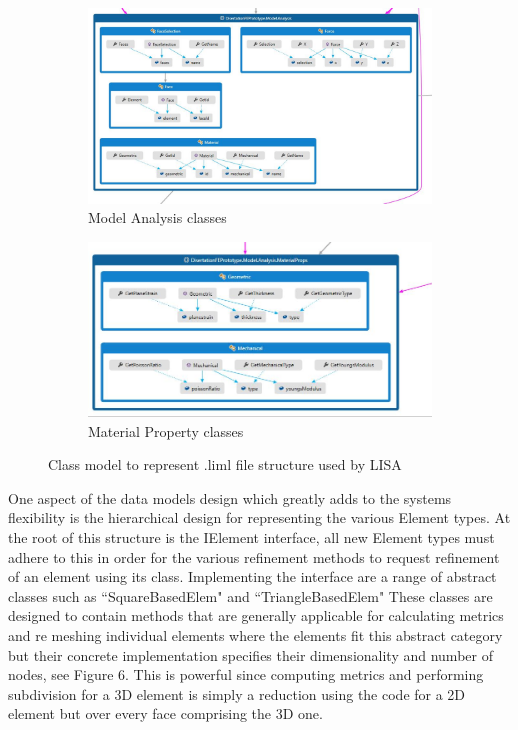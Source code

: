 \begin{figure}[H]
\centering
\begin{subfigure}{.5\textwidth}
  \centering
  \includegraphics[width=0.9\linewidth]{../Graphics/DissoFEProto-ModelAnalysis.jpg}
  \caption{Model Analysis classes}
  \label{fig:sub1}
\end{subfigure}%
\begin{subfigure}{.5\textwidth}
  \centering
  \includegraphics[width=0.9\linewidth]{../Graphics/DissoFEProto-MaterialProps.jpg}
  \caption{Material Property classes}
  \label{fig:sub2}
\end{subfigure}
\label{fig:test}
\caption{Class model to represent .liml file structure used by LISA}
\end{figure}

\noindent
One aspect of the data models design which greatly adds to the systems flexibility is the hierarchical design for representing the various Element types. At the root of this structure is the IElement interface, all new Element types must adhere to this in order for the various refinement methods to request refinement of an element using its class. Implementing the interface are a range of abstract classes such as ``SquareBasedElem" and ``TriangleBasedElem" These classes are designed to contain methods that are generally applicable for calculating metrics and re meshing individual elements where the elements fit this abstract category but their concrete implementation specifies their dimensionality and number of nodes, see Figure 6. This is powerful since computing metrics and performing subdivision for a 3D element is simply a reduction using the code for a 2D element but over every face comprising the 3D one. \\ 

